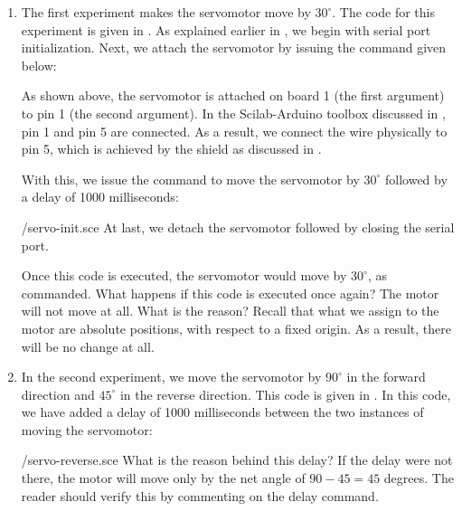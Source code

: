 \begin{enumerate}
  \item The first experiment makes the servomotor move by $30^\circ$. The code for this experiment is
        given in . As explained earlier in , 
        we begin with serial port initialization.
        Next, we attach the servomotor by issuing the command given below:
        
        As shown above, the servomotor is attached on board 1 (the first argument)
        to pin 1 (the second argument).  In the Scilab-Arduino toolbox discussed 
        in , pin 1 and pin 5 are connected. As a result, we connect the wire physically to
        pin 5, which is achieved by the shield as discussed in .
        
        With this, we issue the command to move the servomotor by $30^\circ$ followed by a delay of 
        1000 milliseconds:
        
        {\LocSERscicode/servo-init.sce}
        At last, we  detach the servomotor followed by closing the serial port. 
        
        Once this code is executed, the servomotor would move by
        $30^\circ$, as commanded.  What happens if this code is executed
        once again?  The motor will not move at all.  What is the reason?
        Recall that what we assign to the motor are absolute positions, with
        respect to a fixed origin.  As a result, there will be no change at
        all. 
        
  \item In the second experiment, we move the servomotor by $90^\circ$ in the
        forward direction and $45^\circ$ in the reverse direction.  This
        code is given in .  In this code, 
        we have added a delay of 1000 milliseconds between the two instances of 
        moving the servomotor: 
        
        {\LocSERscicode/servo-reverse.sce}
        What is the reason behind this delay?  If the delay were not
        there, the motor will move only by the net angle of $90-45 = 45$
        degrees.  The reader should verify this by commenting on the delay
        command. 
        

\end{enumerate}
